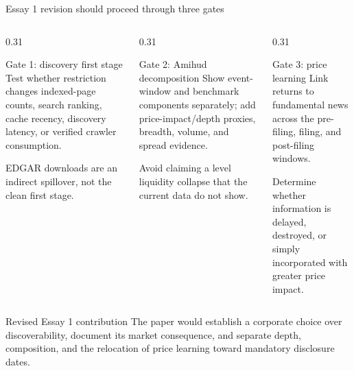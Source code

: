 \documentclass[aspectratio=169,10pt]{beamer}
\begin{document}
\begin{frame}[t]{Essay 1 revision should proceed through three gates}
\begin{columns}[T,onlytextwidth]
  \begin{column}{0.31\textwidth}
    \begin{block}{Gate 1: discovery first stage}
    \small
    Test whether restriction changes indexed-page counts, search ranking, cache recency, discovery latency, or verified crawler consumption.

    \vspace{0.10cm}
    EDGAR downloads are an indirect spillover, not the clean first stage.
    \end{block}
  \end{column}
  \begin{column}{0.31\textwidth}
    \begin{block}{Gate 2: Amihud decomposition}
    \small
    Show event-window and benchmark components separately; add price-impact/depth proxies, breadth, volume, and spread evidence.

    \vspace{0.10cm}
    Avoid claiming a level liquidity collapse that the current data do not show.
    \end{block}
  \end{column}
  \begin{column}{0.31\textwidth}
    \begin{block}{Gate 3: price learning}
    \small
    Link returns to fundamental news across the pre-filing, filing, and post-filing windows.

    \vspace{0.10cm}
    Determine whether information is delayed, destroyed, or simply incorporated with greater price impact.
    \end{block}
  \end{column}
\end{columns}

\begin{exampleblock}{Revised Essay 1 contribution}
\footnotesize The paper would establish a corporate choice over discoverability, document its market consequence, and separate depth, composition, and the relocation of price learning toward mandatory disclosure dates.
\end{exampleblock}
\end{frame}
\end{document}
